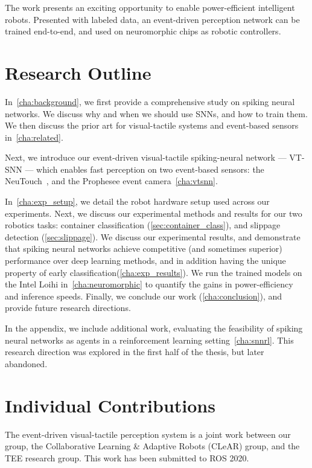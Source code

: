 \documentclass[fyp]{socreport}
\begin{document}
The work presents an exciting opportunity to enable power-efficient intelligent
robots. Presented with labeled data, an event-driven perception network can be
trained end-to-end, and used on neuromorphic chips as robotic controllers.

\section{Research Outline}

In~\autoref{cha:background}, we first provide a comprehensive study on spiking
neural networks. We discuss why and when we should use SNNs, and how to train
them. We then discuss the prior art for visual-tactile systems and event-based
sensors in~\autoref{cha:related}.

Next, we introduce our event-driven visual-tactile spiking-neural network
--- VT-SNN --- which enables fast perception on two event-based sensors: the
NeuTouch~\cite{aiskinLee}, and the Prophesee event camera~\autoref{cha:vtsnn}.

In~\autoref{cha:exp_setup}, we detail the robot hardware setup used across our
experiments. Next, we discuss our experimental methods and results for our two
robotics tasks: container classification (\autoref{sec:container_class}), and
slippage detection (\autoref{sec:slippage}). We discuss our experimental
results, and demonstrate that spiking neural networks achieve competitive (and
sometimes superior) performance over deep learning methods, and in addition
having the unique property of early classification(\autoref{cha:exp_results}).
We run the trained models on the Intel Loihi in~\autoref{cha:neuromorphic} to
quantify the gains in power-efficiency and inference speeds. Finally, we
conclude our work (\autoref{cha:conclusion}), and provide future research
directions.

In the appendix, we include additional work, evaluating the feasibility of
spiking neural networks as agents in a reinforcement learning
setting~\autoref{cha:snnrl}. This research direction was explored in the first
half of the thesis, but later abandoned.

\section{Individual Contributions}
The event-driven visual-tactile perception system is a joint work between our
group, the Collaborative Learning \& Adaptive Robots (CLeAR) group, and the TEE
research group. This work has been submitted to ROS 2020.
\end{document}
